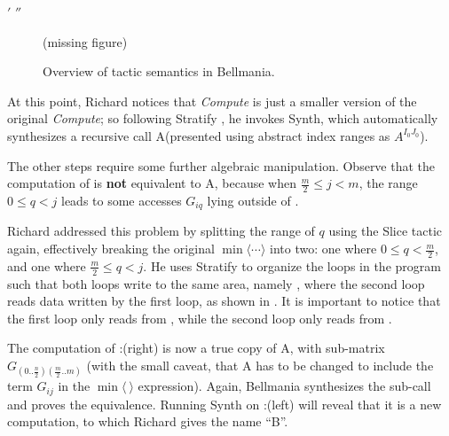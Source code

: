 \newbox\primebox
\setbox\primebox\hbox{$'$}
\newbox\doubleprimebox
\setbox\doubleprimebox\hbox{$''$}

\newcommand\primeocd[1]{\hspace{\wd\primebox}#1\usebox\primebox}
\newcommand\doubleprimeocd[1]{\hspace{\wd\doubleprimebox}#1\usebox\doubleprimebox}

\begin{figure}
\centering
\ifarmando
\bigskip(missing figure)\bigskip
\else

\vspace{-2mm}
\fi
\caption[caption]{\label{overview:slice-stratify-synth}
  Overview of tactic semantics in Bellmania. }
\end{figure}


\medskip
At this point, Richard notices that {\it Compute } is just a smaller version of
the original {\it Compute}; so following {\sf Stratify} , he invokes {\sf Synth}, which automatically
synthesizes a recursive call A
(presented using abstract index ranges as $A^{I_0J_0}$).

The other steps require some further algebraic manipulation.
Observe that the computation of  is {\bf not} equivalent to
A, 
because when $\frac{m}{2} \leq j < m$, the range $0\leq q < j$ leads to
some accesses $G_{iq}$ lying outside of .

Richard addressed this problem by splitting the range of $q$ using the {\sf Slice}
tactic again, effectively breaking the original $\min\langle\cdots\rangle$ into two:
one where $0\leq q < \frac{m}{2}$,
and one where $\frac{m}{2}\leq q < j$. 
He uses {\sf Stratify} to organize the loops in the program such that both 
loops write to the same area, namely , where the second loop reads data
written by the first loop, as shown in .
It is important to notice that the first loop only reads from , 
while the second loop only reads from .

The computation of :(right) is now a true copy of A,
with sub-matrix $G_{(0..\frac{n}{2})(\frac{m}{2}..m)}$ (with the small caveat,
that A has to be changed to include the term $G_{ij}$ in the $\min\langle~\rangle$ expression).
Again, Bellmania synthesizes the sub-call and proves the equivalence.
Running {\sf Synth} on :(left) will reveal that it is a new computation,
to which Richard gives the name ``B''. 

